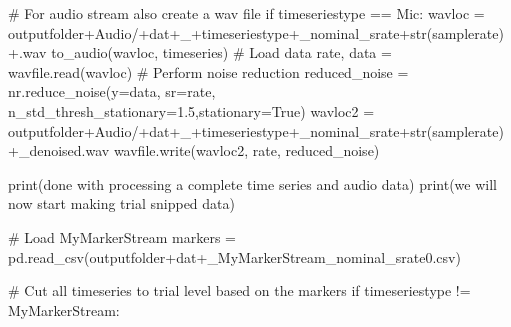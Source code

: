 \documentclass[
  letterpaper,
  DIV=11,
  numbers=noendperiod]{scrreprt}
\newenvironment{Shaded}{\begin{snugshade}}{\end{snugshade}}
\newcommand{\BuiltInTok}[1]{\textcolor[rgb]{0.00,0.23,0.31}{#1}}
\newcommand{\CommentTok}[1]{\textcolor[rgb]{0.37,0.37,0.37}{#1}}
\newcommand{\ControlFlowTok}[1]{\textcolor[rgb]{0.00,0.23,0.31}{#1}}
\newcommand{\FloatTok}[1]{\textcolor[rgb]{0.68,0.00,0.00}{#1}}
\newcommand{\NormalTok}[1]{\textcolor[rgb]{0.00,0.23,0.31}{#1}}
\newcommand{\OperatorTok}[1]{\textcolor[rgb]{0.37,0.37,0.37}{#1}}
\newcommand{\StringTok}[1]{\textcolor[rgb]{0.13,0.47,0.30}{#1}}
\newcommand{\VariableTok}[1]{\textcolor[rgb]{0.07,0.07,0.07}{#1}}
\begin{document}
\begin{Shaded}
\begin{Highlighting}[]
        \CommentTok{\# For audio stream also create a wav file}
        \ControlFlowTok{if}\NormalTok{ timeseriestype }\OperatorTok{==} \StringTok{\textquotesingle{}Mic\textquotesingle{}}\NormalTok{:}
\NormalTok{            wavloc }\OperatorTok{=}\NormalTok{ outputfolder}\OperatorTok{+}\StringTok{\textquotesingle{}Audio/\textquotesingle{}}\OperatorTok{+}\NormalTok{dat}\OperatorTok{+}\StringTok{\textquotesingle{}\_\textquotesingle{}}\OperatorTok{+}\NormalTok{timeseriestype}\OperatorTok{+}\StringTok{\textquotesingle{}\_nominal\_srate\textquotesingle{}}\OperatorTok{+}\BuiltInTok{str}\NormalTok{(samplerate)}\OperatorTok{+}\StringTok{\textquotesingle{}.wav\textquotesingle{}}
\NormalTok{            to\_audio(wavloc, timeseries)}
            \CommentTok{\# Load data}
\NormalTok{            rate, data }\OperatorTok{=}\NormalTok{ wavfile.read(wavloc)}
            \CommentTok{\# Perform noise reduction}
\NormalTok{            reduced\_noise }\OperatorTok{=}\NormalTok{ nr.reduce\_noise(y}\OperatorTok{=}\NormalTok{data, sr}\OperatorTok{=}\NormalTok{rate, n\_std\_thresh\_stationary}\OperatorTok{=}\FloatTok{1.5}\NormalTok{,stationary}\OperatorTok{=}\VariableTok{True}\NormalTok{)}
\NormalTok{            wavloc2 }\OperatorTok{=}\NormalTok{ outputfolder}\OperatorTok{+}\StringTok{\textquotesingle{}Audio/\textquotesingle{}}\OperatorTok{+}\NormalTok{dat}\OperatorTok{+}\StringTok{\textquotesingle{}\_\textquotesingle{}}\OperatorTok{+}\NormalTok{timeseriestype}\OperatorTok{+}\StringTok{\textquotesingle{}\_nominal\_srate\textquotesingle{}}\OperatorTok{+}\BuiltInTok{str}\NormalTok{(samplerate)}\OperatorTok{+}\StringTok{\textquotesingle{}\_denoised.wav\textquotesingle{}}
\NormalTok{            wavfile.write(wavloc2, rate, reduced\_noise)}

        \BuiltInTok{print}\NormalTok{(}\StringTok{\textquotesingle{}done with processing a complete time series and audio data\textquotesingle{}}\NormalTok{)}
        \BuiltInTok{print}\NormalTok{(}\StringTok{\textquotesingle{}we will now start making trial snipped data\textquotesingle{}}\NormalTok{) }

        \CommentTok{\# Load MyMarkerStream}
\NormalTok{        markers }\OperatorTok{=}\NormalTok{ pd.read\_csv(outputfolder}\OperatorTok{+}\NormalTok{dat}\OperatorTok{+}\StringTok{\textquotesingle{}\_MyMarkerStream\_nominal\_srate0.csv\textquotesingle{}}\NormalTok{)}
        
        \CommentTok{\# Cut all timeseries to trial level based on the markers}
        \ControlFlowTok{if}\NormalTok{ timeseriestype }\OperatorTok{!=} \StringTok{\textquotesingle{}MyMarkerStream\textquotesingle{}}\NormalTok{:}
            

\end{Highlighting}
\end{Shaded}
\end{document}
